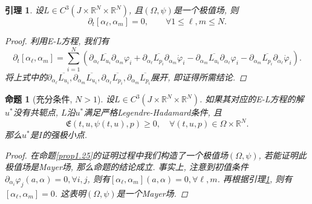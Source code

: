 \documentclass[12pt,a4paper]{article}
\newtheorem{proposition}[theorem]{命题}
\newtheorem{lemma}[theorem]{引理}
\begin{document}
\begin{lemma}\label{lma1.32}
    设$L \in C^3(J \times \mathbb{R}^N \times \mathbb{R}^N)$, 且$(\Omega, \psi)$是一个极值场, 则 
    \begin{equation*}
        \partial_t[\alpha_\ell, \alpha_m] = 0, \qquad \forall 1 \leq \ell, m \leq N.
    \end{equation*}
    \begin{proof}
        利用E-L方程, 我们有 
        \begin{equation*}
            \partial_t[\alpha_\ell, \alpha_m] = \sum_{i = 1}^N\left(\partial_{\alpha_{\ell}}\overline{L_{u_i}}\partial_{\alpha_m}\varphi_i + \partial_{\alpha_{\ell}}\overline{L_{p_i}}\partial_{\alpha_m}\dot\varphi_i - \partial_{\alpha_m}\overline{L_{u_i}}\partial_{\alpha_{\ell}}\varphi_i - \partial_{\alpha_m}\overline{L_{p_i}}\partial_{\alpha_{\ell}}\dot\varphi_i\right).
        \end{equation*}
        将上式中的$\partial_{\alpha_{\ell}}\overline{L_{u_i}}, \partial_{\alpha_m}\overline{L_{u_i}}, \partial_{\alpha_{\ell}}\overline{L_{p_i}}, \partial_{\alpha_m}\overline{L_{p_i}}$展开, 即证得所需结论.
    \end{proof}
\end{lemma}

\begin{proposition}[充分条件, $N > 1$]
    设$L \in C^3(J \times \mathbb{R}^N \times \mathbb{R}^N)$. 如果其对应的E-L方程的解$u^*$没有共轭点, $L$沿$u^*$满足严格Legendre-Hadamard条件, 且 
    \begin{equation*}
        \mathfrak{E}(t, u, \psi(t, u), p) \geq 0, \quad \forall (t, u, p) \in \Omega \times \mathbb{R}^N. 
    \end{equation*}
    那么$u^*$是$I$的强极小点.
    \begin{proof}
        在命题\ref{prop1.25}的证明过程中我们构造了一个极值场$(\Omega, \psi)$, 若能证明此极值场是Mayer场, 那么命题的结论成立.
        事实上, 注意到初值条件$\partial_{\alpha_i}\varphi_j(a, \alpha) = 0, \forall i, j$, 则有$[\alpha_{\ell}, \alpha_m](a, \alpha) = 0, \forall \ell, m$.
        再根据引理\ref{lma1.32}, 则有$[\alpha_{\ell}, \alpha_m] = 0$. 这表明$(\Omega, \psi)$是一个Mayer场.
    \end{proof}
\end{proposition}
\end{document}
